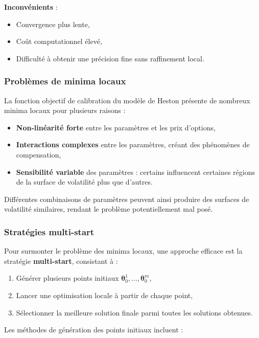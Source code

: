 \textbf{Inconvénients} :
\begin{itemize}
	\item Convergence plus lente,
	\item Coût computationnel élevé,
	\item Difficulté à obtenir une précision fine sans raffinement local.
\end{itemize}

\subsubsection{Problèmes de minima locaux}

La fonction objectif de calibration du modèle de Heston présente de nombreux minima locaux pour plusieurs raisons :

\begin{itemize}
	\item \textbf{Non-linéarité forte} entre les paramètres et les prix d'options,
	\item \textbf{Interactions complexes} entre les paramètres, créant des phénomènes de compensation,
	\item \textbf{Sensibilité variable} des paramètres : certains influencent certaines régions de la surface de volatilité plus que d'autres.
\end{itemize}

Différentes combinaisons de paramètres peuvent ainsi produire des surfaces de volatilité similaires, rendant le problème potentiellement mal posé.

\subsubsection{Stratégies multi-start}

Pour surmonter le problème des minima locaux, une approche efficace est la stratégie \textbf{multi-start}, consistant à :

\begin{enumerate}
	\item Générer plusieurs points initiaux $\boldsymbol{\theta}_0^1, \ldots, \boldsymbol{\theta}_0^m$,
	\item Lancer une optimisation locale à partir de chaque point,
	\item Sélectionner la meilleure solution finale parmi toutes les solutions obtenues.
\end{enumerate}

Les méthodes de génération des points initiaux incluent :

